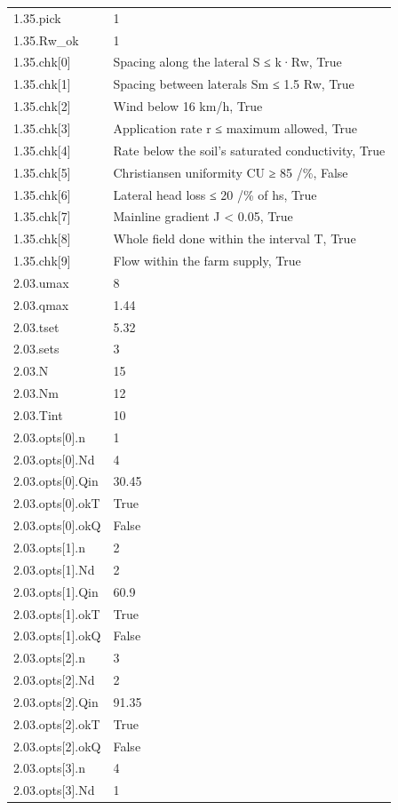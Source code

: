 {\begin{longtable}{p{}p{}}
{}1.35.pick & 1\\
{}1.35.Rw\_ok & 1\\
{}1.35.chk[0] & Spacing along the lateral S ≤ k·Rw, True\\
{}1.35.chk[1] & Spacing between laterals Sm ≤ 1.5 Rw, True\\
{}1.35.chk[2] & Wind below 16 km/h, True\\
{}1.35.chk[3] & Application rate r ≤ maximum allowed, True\\
{}1.35.chk[4] & Rate below the soil’s saturated conductivity, True\\
{}1.35.chk[5] & Christiansen uniformity CU ≥ 85 /\%, False\\
{}1.35.chk[6] & Lateral head loss ≤ 20 /\% of hs, True\\
{}1.35.chk[7] & Mainline gradient J < 0.05, True\\
{}1.35.chk[8] & Whole field done within the interval T, True\\
{}1.35.chk[9] & Flow within the farm supply, True\\
{}2.03.umax & 8\\
{}2.03.qmax & 1.44\\
{}2.03.tset & 5.32\\
{}2.03.sets & 3\\
{}2.03.N & 15\\
{}2.03.Nm & 12\\
{}2.03.Tint & 10\\
{}2.03.opts[0].n & 1\\
{}2.03.opts[0].Nd & 4\\
{}2.03.opts[0].Qin & 30.45\\
{}2.03.opts[0].okT & True\\
{}2.03.opts[0].okQ & False\\
{}2.03.opts[1].n & 2\\
{}2.03.opts[1].Nd & 2\\
{}2.03.opts[1].Qin & 60.9\\
{}2.03.opts[1].okT & True\\
{}2.03.opts[1].okQ & False\\
{}2.03.opts[2].n & 3\\
{}2.03.opts[2].Nd & 2\\
{}2.03.opts[2].Qin & 91.35\\
{}2.03.opts[2].okT & True\\
{}2.03.opts[2].okQ & False\\
{}2.03.opts[3].n & 4\\
{}2.03.opts[3].Nd & 1\\

\end{longtable}}
